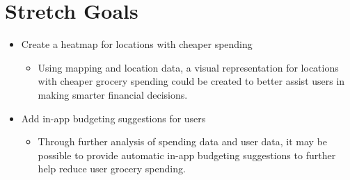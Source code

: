 \documentclass{article}
\begin{document}
\section{Stretch Goals}

\begin{itemize}
  \item Create a heatmap for locations with cheaper spending
  \begin{itemize}
    \item Using mapping and location data, a visual representation for locations with
    cheaper grocery spending could be created to better assist users in making smarter
    financial decisions.
  \end{itemize}  
  \item Add in-app budgeting suggestions for users
  \begin{itemize}
    \item Through further analysis of spending data and user data, it may be possible to provide 
    automatic in-app budgeting suggestions to further help reduce user grocery spending.
  \end{itemize}  
\end{itemize}  
\end{document}
